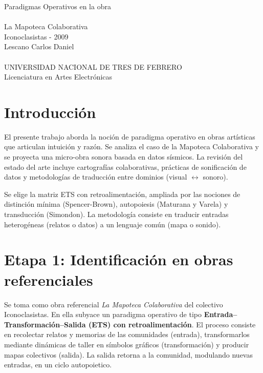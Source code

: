 \documentclass[spanish]{report}
\title{\tituloDocumento}
\author{\autor}
\date{\fechaHoy}
\newcommand{\fechaHoy}{\DTMdisplaydate{\year}{\month}{\day}{-1}} %
\newcommand{\tituloDocumento}{Paradigmas Operativos en la obra \\ \\  La Mapoteca Colaborativa \\Iconoclasistas - 2009   }
\newcommand{\autor}{Lescano Carlos Daniel}
\newcommand{\carrera}{Licenciatura en Artes Electrónicas}
\newcommand{\universidad}{UNIVERSIDAD NACIONAL DE TRES DE FEBRERO}
\begin{document}


\begin{center}
    {\Large \tituloDocumento}\\[0.5cm]
    {\large \autor}\\[0.3cm]
    {\small \fechaHoy}\\[1cm]
    {\large \universidad}\\
    {\large \carrera}\end{center}
    
\vspace*{2cm}
\thispagestyle{empty} %

\pagestyle{fancy} %

\section{Introducción}
El presente trabajo aborda la noción de paradigma operativo en obras artísticas que articulan intuición y razón. Se analiza el caso de la Mapoteca Colaborativa y se proyecta una micro-obra sonora basada en datos sísmicos. La revisión del estado del arte incluye cartografías colaborativas, prácticas de sonificación de datos y metodologías de traducción entre dominios (visual $\leftrightarrow$ sonoro).

Se elige la matriz ETS con retroalimentación, ampliada por las nociones de distinción mínima (Spencer-Brown), autopoiesis (Maturana y Varela) y transducción (Simondon). La metodología consiste en traducir entradas heterogéneas (relatos o datos) a un lenguaje común (mapa o sonido).

\section{Etapa 1: Identificación en obras referenciales}
Se toma como obra referencial \emph{La Mapoteca Colaborativa} del colectivo Iconoclasistas. 
En ella subyace un paradigma operativo de tipo \textbf{Entrada–Transformación–Salida (ETS) con retroalimentación}. 
El proceso consiste en recolectar relatos y memorias de las comunidades (entrada), transformarlos mediante dinámicas de taller en símbolos gráficos (transformación) y producir mapas colectivos (salida). 
La salida retorna a la comunidad, modulando nuevas entradas, en un ciclo autopoietico.
\end{document}
